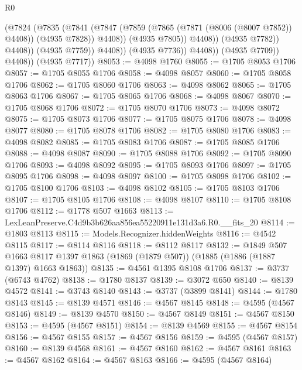 \begin{lexlean}{R0}
\begin{coremodule}
                                (@7824
                                  (@7835
                                    (@7841
                                      (@7847
                                        (@7859
                                          (@7865 (@7871 (@8006 (@8007 @7852)) @4408))
                                          (@4935 @7828))
                                        @4408))
                                    (@4935 @7805))
                                  @4408))
                              (@4935 @7782))
                            @4408))
                        (@4935 @7759))
                      @4408))
                  (@4935 @7736))
                @4408))
            (@4935 @7709))
          @4408))
      (@4935 @7717))
@8053 := @4098 @1760
@8055 := @1705 @8053 @1706
@8057 := @1705 @8055 @1706
@8058 := @4098 @8057
@8060 := @1705 @8058 @1706
@8062 := @1705 @8060 @1706
@8063 := @4098 @8062
@8065 := @1705 @8063 @1706
@8067 := @1705 @8065 @1706
@8068 := @4098 @8067
@8070 := @1705 @8068 @1706
@8072 := @1705 @8070 @1706
@8073 := @4098 @8072
@8075 := @1705 @8073 @1706
@8077 := @1705 @8075 @1706
@8078 := @4098 @8077
@8080 := @1705 @8078 @1706
@8082 := @1705 @8080 @1706
@8083 := @4098 @8082
@8085 := @1705 @8083 @1706
@8087 := @1705 @8085 @1706
@8088 := @4098 @8087
@8090 := @1705 @8088 @1706
@8092 := @1705 @8090 @1706
@8093 := @4098 @8092
@8095 := @1705 @8093 @1706
@8097 := @1705 @8095 @1706
@8098 := @4098 @8097
@8100 := @1705 @8098 @1706
@8102 := @1705 @8100 @1706
@8103 := @4098 @8102
@8105 := @1705 @8103 @1706
@8107 := @1705 @8105 @1706
@8108 := @4098 @8107
@8110 := @1705 @8108 @1706
@8112 := @1778 @507 @1663
@8113 := LexLeanPreserve.C4d9b3b626aa856ea55220911e131d3a6.R0.__fits_20
@8114 := @1803 @8113
@8115 := Models.Recognizer.hiddenWeights
@8116 := @4542 @8115
@8117 := @8114 @8116
@8118 := @8112 @8117
@8132 := @1849
    @507
    @1663
    @8117
    @1397
    @1863
    (@1869 (@1879 @507))
    (@1885 (@1886 (@1887 @1397) @1663 @1863))
@8135 := @4561 @1395 @8108 @1706
@8137 := @3737 (@6743 @4762)
@8138 := @1780 @8137
@8139 := @3072 @650
@8140 := @8139 @4572
@8141 := @3743 @8140
@8143 := @3737 (@3899 @8141)
@8144 := @1780 @8143
@8145 := @8139 @4571
@8146 := @4567 @8145
@8148 := @4595 (@4567 @8146)
@8149 := @8139 @4570
@8150 := @4567 @8149
@8151 := @4567 @8150
@8153 := @4595 (@4567 @8151)
@8154 := @8139 @4569
@8155 := @4567 @8154
@8156 := @4567 @8155
@8157 := @4567 @8156
@8159 := @4595 (@4567 @8157)
@8160 := @8139 @4568
@8161 := @4567 @8160
@8162 := @4567 @8161
@8163 := @4567 @8162
@8164 := @4567 @8163
@8166 := @4595 (@4567 @8164)

\end{coremodule}
\end{lexlean}
